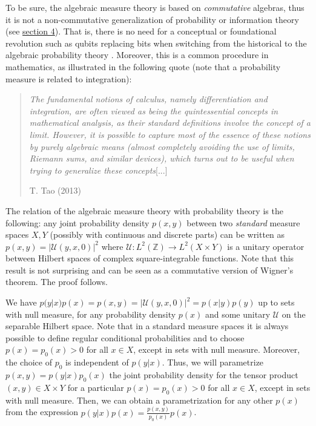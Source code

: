 \documentclass[11pt]{book}
\begin{document}
To be sure, the algebraic measure theory is based on \emph{commutative}
algebras, thus it is not a non-commutative generalization of probability
or information theory (see
\protect\hyperlink{quantum-mechanics-versus-a-non-commutative-generalization-of-probability-theory}{section
4}). That is, there is no need for a conceptual or foundational
revolution such as qubits replacing bits when switching from the
historical to the algebraic probability theory
\cite{whittle2000probability}.
Moreover, this is a common procedure in mathematics, as illustrated in
the following quote \cite{integration} (note that a probability measure is related to integration):

\begin{quote}
\emph{The fundamental notions of calculus, namely differentiation and
integration, are often viewed as being the quintessential concepts in
mathematical analysis, as their standard definitions involve the concept
of a limit. However, it is possible to capture most of the essence of
these notions by purely algebraic means (almost completely avoiding the
use of limits, Riemann sums, and similar devices), which turns out to be
useful when trying to generalize these concepts}{[}...{]}

T. Tao (2013)\cite{integration}
\end{quote}

The relation of the algebraic measure theory with probability theory is
the following: any joint probability density \(p(x,y)\) between two
\emph{standard} measure spaces \(X, Y\) (possibly with continuous and
discrete parts) can be written as \(p(x,y)=|\mathcal{U}(y,x,0)|^2\)
where \(\mathcal{U}:L^2(\mathbb{Z})\to L^2(X\times Y)\) is a unitary
operator between Hilbert spaces of complex square-integrable functions.
Note that this result is not surprising and can be seen as a commutative
version of Wigner's theorem\cite{Geh_r_2014}. The proof follows.

We have \(p(y|x)p(x)=p(x,y)=|\mathcal{U}(y,x,0)|^2=p(x|y)p(y)\) up to
sets with null measure, for any probability density \(p(x)\) and some
unitary \(\mathcal{U}\) on the separable Hilbert space. Note that in a
standard measure spaces it is always possible to define regular
conditional
probabilities\cite{durrett2019probability} and to choose \(p(x)=p_0(x)>0\) for all \(x\in X\), except in
sets with null measure. Moreover, the choice of \(p_0\) is independent
of \(p(y|x)\). Thus, we will parametrize \(p(x, y)=p(y|x)p_0(x)\) the
joint probability density for the tensor product \((x, y)\in X\times Y\)
for a particular \(p(x)=p_0(x)>0\) for all \(x\in X\), except in sets
with null measure. Then, we can obtain a parametrization for any other
\(p(x)\) from the expression \(p(y|x)p(x)=\frac{p(x,y)}{p_0(x)}p(x)\).
\end{document}
